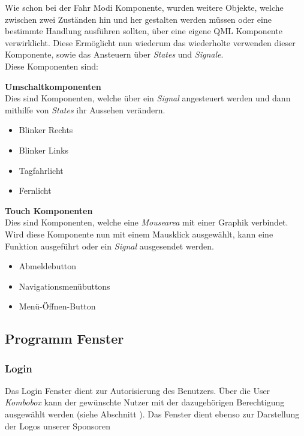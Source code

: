 Wie schon bei der Fahr Modi Komponente, wurden weitere Objekte, welche zwischen zwei Zuständen hin und her gestalten werden müssen oder eine bestimmte Handlung ausführen sollten, über eine eigene QML Komponente verwirklicht. Diese Ermöglicht nun wiederum das wiederholte verwenden dieser Komponente, sowie das Ansteuern über \textit{States} und \textit{Signale}.\\
Diese Komponenten sind:

\textbf{Umschaltkomponenten}\\
Dies sind Komponenten, welche über ein \textit{Signal} angesteuert werden und dann mithilfe von \textit{States} ihr Aussehen verändern.

\begin{itemize}
	
	\item Blinker Rechts
	\item Blinker Links
	\item Tagfahrlicht
	\item Fernlicht
	
\end{itemize}

\textbf{Touch Komponenten}\\
Dies sind Komponenten, welche eine \textit{Mousearea} mit einer Graphik verbindet. Wird diese Komponente nun mit einem Mausklick ausgewählt, kann eine Funktion ausgeführt oder ein \textit{Signal} ausgesendet werden.

\begin{itemize}
	
	\item Abmeldebutton
	\item Navigationsmenübuttons
	\item Menü-Öffnen-Button
	
\end{itemize}

\newpage

\subsection{Programm Fenster}

\subsubsection{Login}

Das Login Fenster dient zur Autorisierung des Benutzers. Über die User \textit{Kombobox} kann der gewünschte Nutzer mit der dazugehörigen Berechtigung ausgewählt werden (siehe Abschnitt ). Das Fenster dient ebenso zur Darstellung der Logos unserer Sponsoren\\

